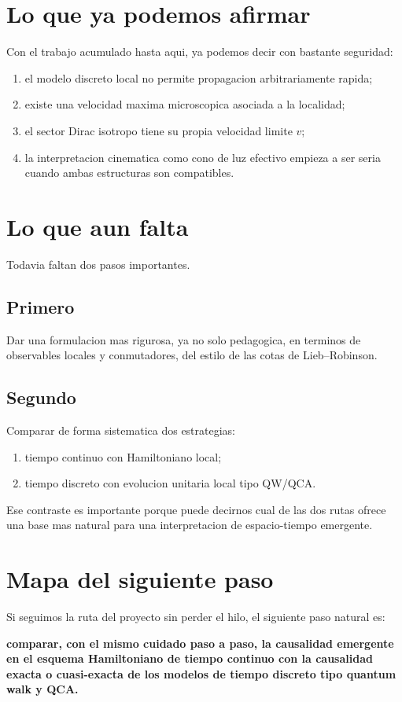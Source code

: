 \section{Lo que ya podemos afirmar}
Con el trabajo acumulado hasta aqui, ya podemos decir con bastante seguridad:
\begin{enumerate}[label=\arabic*.]
    \item el modelo discreto local no permite propagacion arbitrariamente rapida;
    \item existe una velocidad maxima microscopica asociada a la localidad;
    \item el sector Dirac isotropo tiene su propia velocidad limite \(v\);
    \item la interpretacion cinematica como cono de luz efectivo empieza a ser seria cuando ambas estructuras son compatibles.
\end{enumerate}

\section{Lo que aun falta}
Todavia faltan dos pasos importantes.

\subsection{Primero}
Dar una formulacion mas rigurosa, ya no solo pedagogica, en terminos de observables locales y conmutadores, del estilo de las cotas de Lieb--Robinson.

\subsection{Segundo}
Comparar de forma sistematica dos estrategias:
\begin{enumerate}[label=\arabic*.]
    \item tiempo continuo con Hamiltoniano local;
    \item tiempo discreto con evolucion unitaria local tipo QW/QCA.
\end{enumerate}

Ese contraste es importante porque puede decirnos cual de las dos rutas ofrece una base mas natural para una interpretacion de espacio-tiempo emergente.

\section{Mapa del siguiente paso}
Si seguimos la ruta del proyecto sin perder el hilo, el siguiente paso natural es:
\begin{displayquote}
\textbf{comparar, con el mismo cuidado paso a paso, la causalidad emergente en el esquema Hamiltoniano de tiempo continuo con la causalidad exacta o cuasi-exacta de los modelos de tiempo discreto tipo quantum walk y QCA.}
\end{displayquote}


